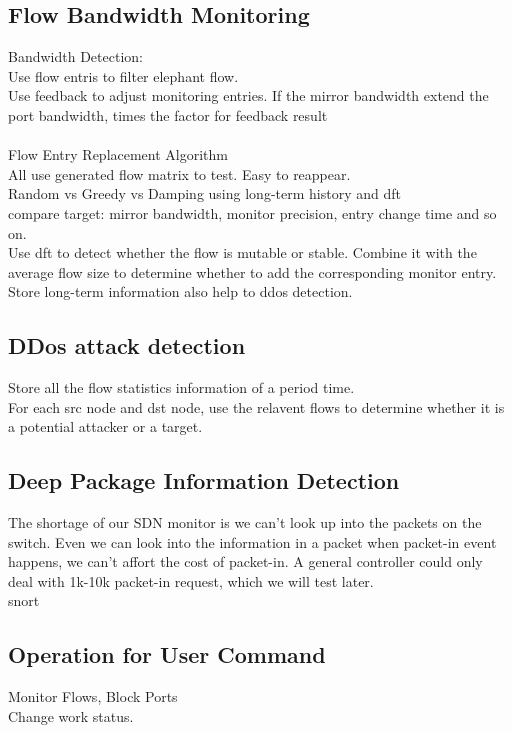 \documentclass{acm_proc_article-sp}
\begin{document}
\subsection{Flow Bandwidth Monitoring}
Bandwidth Detection:\\
Use flow entris to filter elephant flow.\\
Use feedback to adjust monitoring entries. If the mirror bandwidth extend the port bandwidth, times the factor for feedback result\\
\\
Flow Entry Replacement Algorithm\\
All use generated flow matrix to test. Easy to reappear.\\
Random vs Greedy vs Damping using long-term history and dft\\
compare target: mirror bandwidth,  monitor precision, entry change time and so on.\\
Use dft to detect whether the flow is mutable or stable. Combine it with the average flow size to determine whether to add the corresponding monitor entry.\\
Store long-term information also help to ddos detection.\\

\subsection{DDos attack detection}
Store all the flow statistics information of a period time.\\
For each src node and dst node, use the relavent flows to determine whether it is a potential attacker or a target.

\subsection{Deep Package Information Detection}
The shortage of our SDN monitor is we can't look up into the packets on the switch. Even we can look into the information in a packet when packet-in event happens, we can't affort the cost of packet-in. A general controller could only deal with 1k-10k packet-in request, which we will test later.\\
snort

\subsection{Operation for User Command}
Monitor Flows, Block Ports\\
Change work status.\\
\end{document}
